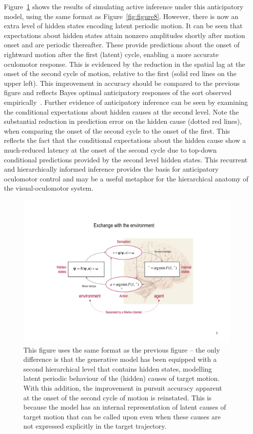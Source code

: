 \documentclass[a4paper]{article} %
\begin{document}
Figure~\ref{fig:figure9} shows the results of simulating active inference under this
anticipatory model, using the same format as Figure~\ref{fig:figure8}. However, there is
now an extra level of hidden states encoding latent periodic motion. It
can be seen that expectations about hidden states attain nonzero
amplitudes shortly after motion onset and are periodic thereafter. These
provide predictions about the onset of rightward motion after the first
(latent) cycle, enabling a more accurate oculomotor response. This is
evidenced by the reduction in the spatial lag at the onset of the second
cycle of motion, relative to the first (solid red lines on the upper
left). This improvement in accuracy should be compared to the previous
figure and reflects Bayes optimal anticipatory responses of the sort
observed empirically~\citep{Barnes00}. Further evidence of
anticipatory inference can be seen by examining the conditional
expectations about hidden causes at the second level. Note the
substantial reduction in prediction error on the hidden cause (dotted
red lines), when comparing the onset of the second cycle to the onset of
the first. This reflects the fact that the conditional expectations
about the hidden cause show a much-reduced latency at the onset of the
second cycle due to top-down conditional predictions provided by the
second level hidden states. This recurrent and hierarchically informed
inference provides the basis for anticipatory oculomotor control and may
be a useful metaphor for the hierarchical anatomy of the
visual-oculomotor system.



\begin{figure}%
 \centerline{%
 \includegraphics[width=.8\columnwidth, clip, trim = 7cm 0cm 7cm 0cm, page=9]{Figures_slides.pdf} %
}%
\caption{This figure uses the same format as the previous
figure -- the only difference is that the generative model has been
equipped with a second hierarchical level that contains hidden states,
modelling latent periodic behaviour of the (hidden) causes of target
motion. With this addition, the improvement in pursuit accuracy apparent
at the onset of the second cycle of motion is reinstated. This is
because the model has an internal representation of latent causes of
target motion that can be called upon even when these causes are not
expressed explicitly in the target trajectory.}%
\label{fig:figure9}
\end{figure}
\end{document}
